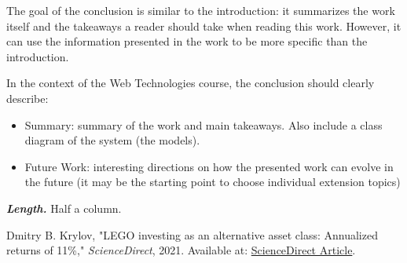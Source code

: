 \documentclass[letterpaper,twocolumn]{article}
\newcommand{\myparagraph}[1]{\vspace{0.1cm}\noindent \textbf{\textit{#1.}}}
\begin{document}
The goal of the conclusion is similar to the introduction: it summarizes the work itself and the takeaways a reader should take when reading this work. However, it can use the information presented in the work to be more specific than the introduction.

In the context of the Web Technologies course, the conclusion should clearly describe:

\begin{itemize}
    \item Summary: summary of the work and main takeaways. Also include a class diagram of the system (the models).
    \item Future Work: interesting directions on how the presented work can evolve in the future (it may be the starting point to choose individual extension topics)
\end{itemize}

\myparagraph{Length} Half a column.

\begin{thebibliography}{9}

    Dmitry B. Krylov, "LEGO investing as an alternative asset class: Annualized returns of 11\%," 
    \textit{ScienceDirect}, 2021. Available at: \href{https://www.sciencedirect.com/science/article/abs/pii/S0275531921001604?via%3Dihub}{ScienceDirect Article}.
    
\end{thebibliography}
\end{document}
